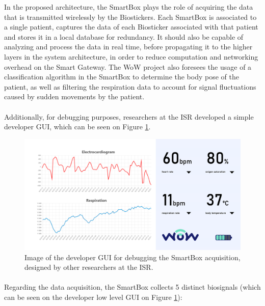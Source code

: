 
In the proposed architecture, the SmartBox plays the role of acquiring the data that is transmitted wirelessly by the Biostickers.
Each SmartBox is associated to a single patient, captures the data of each Biosticker associated with that patient and stores it in a local database for redundancy. 
It should also be capable of analyzing and process the data in real time, before propagating it to the higher layers in the system architecture, in order to reduce computation and networking overhead on the Smart Gateway. The \acs{WoW} project also foresees the usage of a classification algorithm in the SmartBox to determine the body pose of the patient, as well as filtering the respiration data to account for signal fluctuations caused by sudden movements by the patient.  


\paragraph{}Additionally, for debugging purposes, researchers at the \acs{ISR} developed a simple developer \acs{GUI}, which can be seen on Figure \ref{fig:smartbox-gui}.

\begin{figure}[H]
    \centering
    \includegraphics[width=\linewidth]{images/smartbox-gui.png}
    \caption{Image of the developer \acf{GUI} for debugging the SmartBox acquisition, designed by other researchers at the \acs{ISR}.}
    \label{fig:smartbox-gui}
\end{figure}

\paragraph{} Regarding the data acquisition, the SmartBox collects 5 distinct biosignals (which can be seen on the developer low level \acs{GUI} on Figure \ref{fig:smartbox-gui}):

